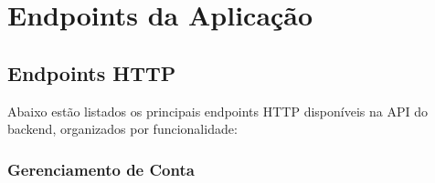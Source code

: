 \chapter{Endpoints da Aplicação}

\section{Endpoints HTTP}

Abaixo estão listados os principais endpoints HTTP disponíveis na API do backend, organizados por funcionalidade:



\subsection{Gerenciamento de Conta}
